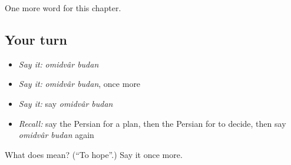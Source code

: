 \begin{grammarlens}[title={What you've built}]
One more word for this chapter.
\end{grammarlens}

\subsection*{Your turn}
\begin{itemize}
\raggedright
  \item \emph{Say it:} \emph{omidvâr budan}
  \item \emph{Say it:} \emph{omidvâr budan}, once more
  \item \emph{Say it:} say \emph{omidvâr budan}
  \item \emph{Recall:} say the Persian for a plan, then the Persian for to decide, then say \emph{omidvâr budan} again
\end{itemize}

\begin{tcolorbox}[breakable,colback=teal!4,colframe=teal!35!black,title={Before you move on}]
What does   mean? (\textquotedblleft{}To hope\textquotedblright{}.) Say it once more.
\end{tcolorbox}
